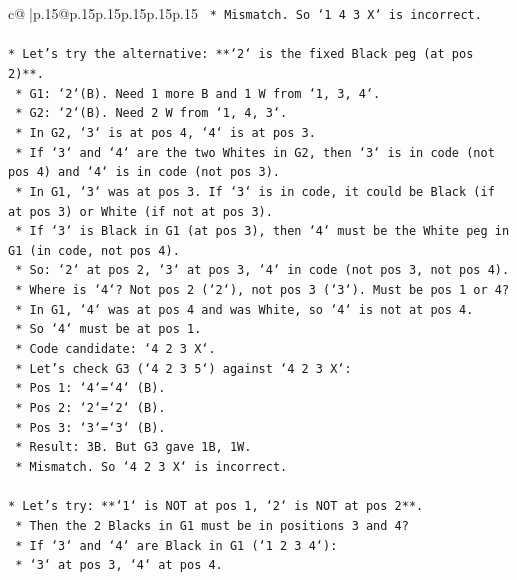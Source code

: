 \documentclass{article}
\begin{document}
{\begin{supertabular}{c@{$\;$}|p{.15\linewidth}@{}p{.15\linewidth}p{.15\linewidth}p{.15\linewidth}p{.15\linewidth}p{.15\linewidth}}
{{{\texttt{                *   Mismatch. So `1 4 3 X` is incorrect.} \\
\\ 
\texttt{*   Let's try the alternative: **`2` is the fixed Black peg (at pos 2)**.} \\
\texttt{    *   G1: `2`(B). Need 1 more B and 1 W from `1, 3, 4`.} \\
\texttt{    *   G2: `2`(B). Need 2 W from `1, 4, 3`.} \\
\texttt{    *   In G2, `3` is at pos 4, `4` is at pos 3.} \\
\texttt{    *   If `3` and `4` are the two Whites in G2, then `3` is in code (not pos 4) and `4` is in code (not pos 3).} \\
\texttt{    *   In G1, `3` was at pos 3. If `3` is in code, it could be Black (if at pos 3) or White (if not at pos 3).} \\
\texttt{    *   If `3` is Black in G1 (at pos 3), then `4` must be the White peg in G1 (in code, not pos 4).} \\
\texttt{    *   So: `2` at pos 2, `3` at pos 3, `4` in code (not pos 3, not pos 4).} \\
\texttt{    *   Where is `4`? Not pos 2 (`2`), not pos 3 (`3`). Must be pos 1 or 4?} \\
\texttt{    *   In G1, `4` was at pos 4 and was White, so `4` is not at pos 4.} \\
\texttt{    *   So `4` must be at pos 1.} \\
\texttt{    *   Code candidate: `4 2 3 X`.} \\
\texttt{    *   Let's check G3 (`4 2 3 5`) against `4 2 3 X`:} \\
\texttt{        *   Pos 1: `4`=`4` (B).} \\
\texttt{        *   Pos 2: `2`=`2` (B).} \\
\texttt{        *   Pos 3: `3`=`3` (B).} \\
\texttt{        *   Result: 3B. But G3 gave 1B, 1W.} \\
\texttt{        *   Mismatch. So `4 2 3 X` is incorrect.} \\
\\ 
\texttt{*   Let's try: **`1` is NOT at pos 1, `2` is NOT at pos 2**.} \\
\texttt{    *   Then the 2 Blacks in G1 must be in positions 3 and 4?} \\
\texttt{    *   If `3` and `4` are Black in G1 (`1 2 3 4`):} \\
\texttt{        *   `3` at pos 3, `4` at pos 4.} \\
}}}
\end{supertabular}}
\end{document}
